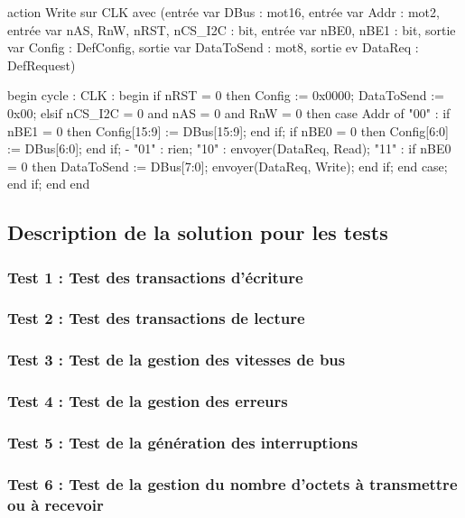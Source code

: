 \begin{VHDLcode}[caption={Algorithme de la fonction Ecriture Interfaces}, label={lst:v}]
action Write sur CLK avec
(entrée var DBus : mot16,
 entrée var Addr : mot2,                 
 entrée var nAS, RnW, nRST, nCS_I2C : bit,
 entrée var nBE0, nBE1 : bit,           
 sortie var Config : DefConfig,
 sortie var DataToSend : mot8,
 sortie ev DataReq : DefRequest)

begin
  cycle :
    CLK : begin
      if nRST = 0 then
        Config := 0x0000; DataToSend := 0x00;
      elsif nCS_I2C = 0 and nAS = 0 and RnW = 0 then   
        case Addr of
          "00" :                                 
            if nBE1 = 0 then Config[15:9] := DBus[15:9]; end if; 
            if nBE0 = 0 then Config[6:0]  := DBus[6:0];  end if;   -
          "01" : rien;                                
          "10" : envoyer(DataReq, Read);             
          "11" : if nBE0 = 0 then                      
                   DataToSend := DBus[7:0];
                   envoyer(DataReq, Write);
                 end if;
        end case;
      end if;
    end
end
\end{VHDLcode}

\subsection{Description de la solution pour les tests}

\subsubsection{Test 1 : Test des transactions d'écriture}

\subsubsection{Test 2 : Test des transactions de lecture}

\subsubsection{Test 3 : Test de la gestion des vitesses de bus}

\subsubsection{Test 4 : Test de la gestion des erreurs}

\subsubsection{Test 5 : Test de la génération des interruptions}

\subsubsection{Test 6 : Test de la gestion du nombre d'octets à transmettre ou à recevoir}



